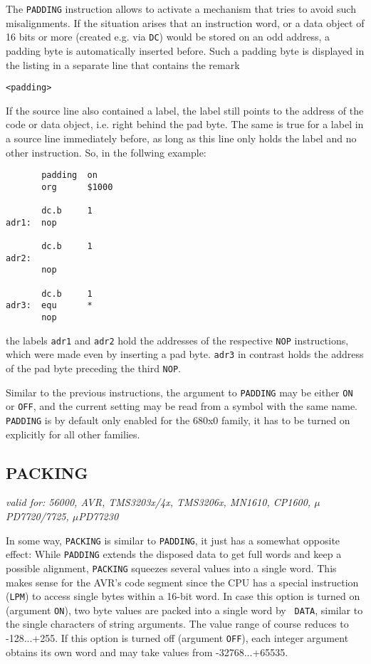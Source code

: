 \documentclass[12pt,twoside]{report}
\makeatletter
\newcommand{\tty}[1]{{\tt #1}}
\newcommand{\ttindex}[1]{\index{#1@{\tt #1}}}
\makeatother
\begin{document}
The \tty{PADDING} instruction allows to activate a mechanism that tries to
avoid such misalignments.  If the situation arises that an instruction
word, or a data object of 16 bits or more (created e.g. via \tty{DC}) would
be stored on an odd address, a padding byte is automatically inserted before.
Such a padding byte is displayed in the listing in a separate line that
contains the remark
\begin{verbatim}
<padding>
\end{verbatim}
If the source line also contained a label, the label still points to the
address of the code or data object, i.e. right behind the pad byte.  The same
is true for a label in a source line immediately before, as long as this
line {\em} only holds the label and no other instruction.  So, in the
follwing example:
\begin{verbatim}
       padding  on
       org      $1000

       dc.b     1
adr1:  nop

       dc.b     1
adr2:
       nop

       dc.b     1
adr3:  equ      *
       nop
\end{verbatim}
the labels \tty{adr1} and \tty{adr2} hold the addresses of the respective
\tty{NOP} instructions, which were made even by inserting a pad byte.
\tty{adr3} in contrast holds the address of the pad byte preceding the
third \tty{NOP}.

Similar to the previous instructions, the argument to \tty{PADDING} may be
either \tty{ON} or \tty{OFF}, and the current setting may be read from a
symbol with the same name.  \tty{PADDING} is by default only enabled for
the 680x0 family, it has to be turned on explicitly for all other families.


\subsection{PACKING}
\ttindex{PACKING}

{\em valid for: 56000, AVR, TMS3203x/4x, TMS3206x, MN1610, CP1600,
     $\mu$PD7720/7725, $\mu$PD77230}

In some way, {\tt PACKING} is similar to {\tt PADDING}, it just has a
somewhat opposite effect: While {\tt PADDING} extends the disposed data to
get full words and keep a possible alignment, {\tt PACKING} squeezes
several values into a single word.  This makes sense for the AVR's code
segment since the CPU has a special instruction ({\tt LPM}) to access
single bytes within a 16-bit word.  In case this option is turned on
(argument {\tt ON}), two byte values are packed into a single word by {\tt
DATA}, similar to the single characters of string arguments.  The value
range of course reduces to -128...+255.  If this option is turned off
(argument {\tt OFF}), each integer argument obtains its own word and may
take values from -32768...+65535.
\end{document}
